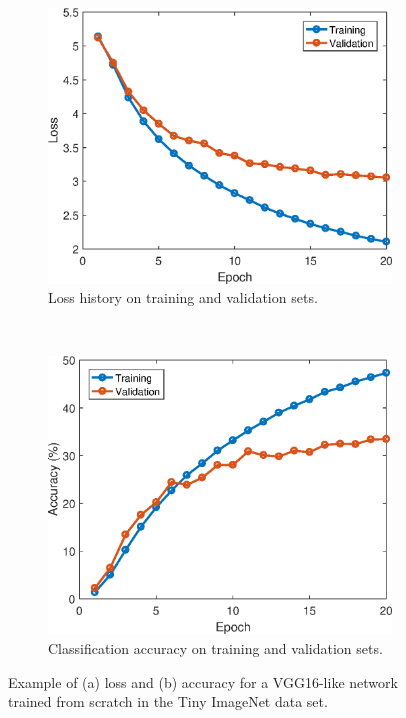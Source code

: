 \documentclass[10pt,twocolumn,letterpaper]{article}
\begin{document}
\begin{figure}[t!]
	\centering
	\begin{subfigure}[h!]{0.5\textwidth}
		\includegraphics[width=\linewidth]{figs/milestone_loss.eps}
		\caption{Loss history on training and validation sets.}
		\label{fig:loss}
	\end{subfigure}%
	~ %
	\begin{subfigure}[h!]{0.5\textwidth}
	\includegraphics[width=\linewidth]{figs/milestone_accuracy.eps}
	\caption{Classification accuracy on training and validation sets.}
	\label{fig:accu}
	\end{subfigure}
	\caption{Example of (a) loss and (b) accuracy for a VGG16-like network trained from scratch in the Tiny ImageNet data set.}\label{fig:preliminary-results}
\end{figure}
\end{document}
